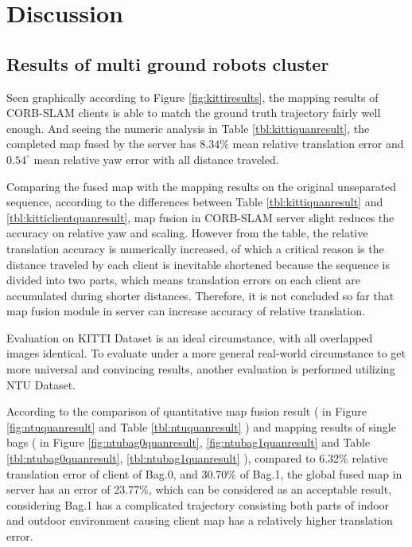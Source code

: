 
\chapter{Discussion}

\section{Results of multi ground robots cluster}
\label{sec:disussmultiground}

Seen graphically according to Figure \ref{fig:kittiresults}, the mapping results of CORB-SLAM clients is able to match the ground truth trajectory fairly well enough. And seeing the numeric analysis in Table \ref{tbl:kittiquanresult}, the completed map fused by the server has $8.34\%$ mean relative translation error and $0.54^\circ$ mean relative yaw error with all distance traveled.

Comparing the fused map with the mapping results on the original unseparated sequence, according to the differences between Table \ref{tbl:kittiquanresult} and \ref{tbl:kitticlientquanresult}, map fusion in CORB-SLAM server slight reduces the accuracy on relative yaw and scaling. However from the table, the relative translation accuracy is numerically increased, of which a critical reason is the distance traveled by each client is inevitable shortened because the sequence is divided into two parts, which means translation errors on each client are accumulated during shorter distances. Therefore, it is not concluded so far that map fusion module in server can increase accuracy of relative translation.

Evaluation on KITTI Dataset is an ideal circumstance, with all overlapped images identical. To evaluate under a more general real-world circumstance to get more universal and convincing results, another evaluation is performed utilizing NTU Dataset. 

According to the comparison of quantitative map fusion result ( in Figure \ref{fig:ntuquanresult} and Table \ref{tbl:ntuquanresult} ) and mapping results of single bags ( in Figure \ref{fig:ntubag0quanresult}, \ref{fig:ntubag1quanresult} and Table \ref{tbl:ntubag0quanresult}, \ref{tbl:ntubag1quanresult} ), compared to 6.32$\%$ relative translation error of client of Bag.0, and 30.70$\%$ of Bag.1, the global fused map in server has an error of 23.77$\%$, which can be considered as an acceptable result, considering Bag.1 has a complicated trajectory consisting both parts of indoor and outdoor environment causing client map has a relatively higher translation error.

